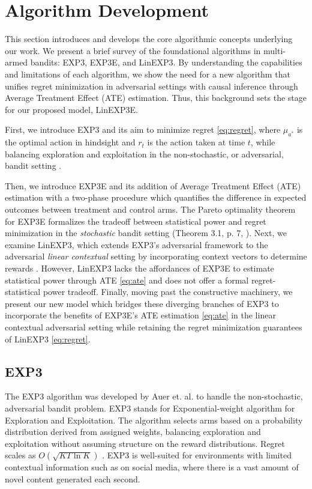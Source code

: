 
\section{Algorithm Development}\label{sec:algorithm}

This section introduces and develops the core algorithmic concepts underlying our work. We present a brief survey of the foundational algorithms in multi-armed bandits: EXP3, EXP3E, and LinEXP3. By understanding the capabilities and limitations of each algorithm, we show the need for a new algorithm that unifies regret minimization in adversarial settings with causal inference through Average Treatment Effect (ATE) estimation. Thus, this background sets the stage for our proposed model, LinEXP3E.

First, we introduce EXP3 and its aim to minimize regret \ref{eq:regret}, 
where $\mu_{a^*}$ is the optimal action in hindsight and $r_t$ is the action taken at time $t$, while balancing exploration and exploitation in the non-stochastic, or adversarial, bandit setting \citep{auer2002exp3}.

Then, we introduce EXP3E and its addition of Average Treatment Effect (ATE) estimation with a two-phase procedure which quantifies the difference in expected outcomes between treatment and control arms. The Pareto optimality theorem for EXP3E formalizes the tradeoff between statistical power and regret minimization in the \textit{stochastic} bandit setting (Theorem 3.1, p. 7, \citealp{simchilevi2023adaptive}). Next, we examine LinEXP3, which extends EXP3’s adversarial framework to the adversarial \textit{linear contextual} setting by incorporating context vectors to determine rewards \citep{neu2020linear}. However, LinEXP3 lacks the affordances of EXP3E to estimate statistical power through ATE \ref{eq:ate} and does not offer a formal regret-statistical power tradeoff. Finally, moving past the constructive machinery, we present our new model which bridges these diverging branches of EXP3 to incorporate the benefits of EXP3E's ATE estimation \ref{eq:ate} in the linear contextual adversarial setting while retaining the regret minimization guarantees of LinEXP3 \ref{eq:regret}.


\subsection{EXP3}\label{subsec:exp3}
The EXP3 algorithm was developed by Auer et. al. \citep{auer2002exp3} to handle the non-stochastic, adversarial bandit problem. EXP3 stands for Exponential-weight algorithm for Exploration and Exploitation. The algorithm selects arms based on a probability distribution derived from assigned weights, balancing exploration and exploitation without assuming structure on the reward distributions. Regret scales as \(O(\sqrt{KT\ln K})\) \citep{auer2002exp3}. EXP3 is well-suited for environments with limited contextual information such as on social media, where there is a vast amount of novel content generated each second.


